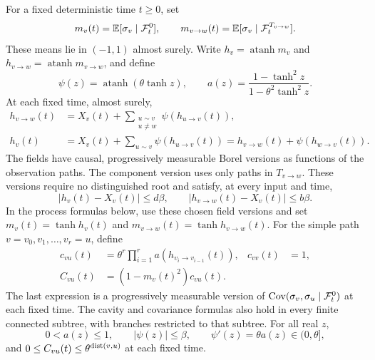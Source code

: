 \begin{lemma}
\label{lem:posterior}
For a fixed deterministic time \(t\ge0\), set
\[
 m_v(t)=\mathbb E[\sigma_v\mid\mathcal F_t^0],\qquad
 m_{v\to w}(t)
   =\mathbb E[\sigma_v\mid\mathcal F_t^{T_{v\to w}}].
\]
These means lie in \((-1,1)\) almost surely.  Write
\(h_v=\operatorname{atanh}m_v\) and
\(h_{v\to w}=\operatorname{atanh}m_{v\to w}\), and define
\[
 \psi(z)=\operatorname{atanh}(\theta\tanh z),\qquad
 a(z)=\frac{1-\tanh^2z}{1-\theta^2\tanh^2z}.
\]
At each fixed time, almost surely,
\begin{equation}
\label{eq:cavity}
 \begin{aligned}
 h_{v\to w}(t)
   &=X_v(t)+\sum_{\substack{u\sim v\\u\ne w}}
                       \psi(h_{u\to v}(t)),\\
 h_v(t)
   &=X_v(t)+\sum_{u\sim v}\psi(h_{u\to v}(t))
     =h_{v\to w}(t)+\psi(h_{w\to v}(t)).
 \end{aligned}
\end{equation}
The fields have causal, progressively measurable Borel versions as
functions of the observation paths.  The component version uses only
paths in \(T_{v\to w}\).  These versions require no distinguished
root and satisfy, at every input and time,
\begin{equation}
\label{eq:site-field-bound}
 |h_v(t)-X_v(t)|\le d\beta,\qquad
 |h_{v\to w}(t)-X_v(t)|\le b\beta.
\end{equation}
In the process formulas below, use these chosen field versions and set
\(m_v(t)=\tanh h_v(t)\) and
\(m_{v\to w}(t)=\tanh h_{v\to w}(t)\).
For the simple path \(v=v_0,v_1,\ldots,v_r=u\), define
\begin{equation}
\label{eq:covariance}
 \begin{aligned}
 c_{vu}(t)
   &=\theta^r\prod_{i=1}^r
                  a(h_{v_i\to v_{i-1}}(t)),&
 c_{vv}(t)&=1,\\
 C_{vu}(t)&=(1-m_v(t)^2)c_{vu}(t).
 \end{aligned}
\end{equation}
The last expression is a progressively measurable version of
\(\operatorname{Cov}(\sigma_v,\sigma_u\mid\mathcal F_t^0)\) at each fixed time.
The cavity and covariance formulas also hold in every finite connected
subtree, with branches restricted to that subtree.  For all real \(z\),
\[
 0<a(z)\le1,\qquad |\psi(z)|\le\beta,\qquad
 \psi'(z)=\theta a(z)\in(0,\theta],
\]
and \(0\le C_{vu}(t)\le\theta^{\operatorname{dist}(v,u)}\) at each fixed time.
\end{lemma}

